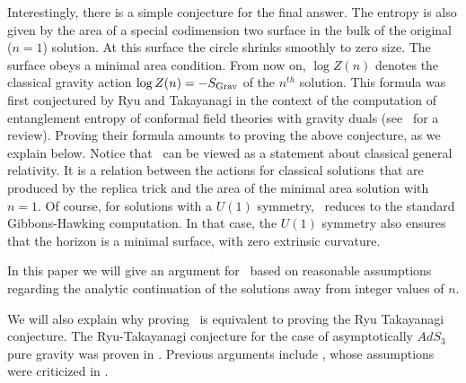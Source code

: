  Interestingly, there is a simple conjecture for the final answer.
 The entropy  is also given by the area of a special codimension two surface in the bulk of the
 original ($n=1$) solution.  At this surface
 the circle shrinks smoothly to zero size. The surface obeys a minimal area condition.
 \eqn{}
  From now on, $\log Z(n)$ denotes the classical gravity action $\log Z(n) = -S_{\rm Grav}$ of the $n^{th}$ solution.
  This formula was first conjectured by Ryu and Takayanagi in the context of the computation of entanglement entropy
 of conformal field theories with gravity duals \RyuBV (see \NishiokaUN\ for a review).
  Proving their formula amounts to proving the above conjecture,
 as we explain below.
 Notice that \RTconj\ can be viewed as
  a statement about classical general relativity. It is a relation between the actions for
  classical solutions  that are produced by the replica trick and the area of the minimal area
 solution with $n=1$. Of course, for solutions with a $U(1)$ symmetry, \RTconj\ reduces to the standard Gibbons-Hawking
 computation. In that case,  the $U(1)$ symmetry also ensures that the horizon is a minimal surface, with zero extrinsic
 curvature.

In this paper we will give an argument for \RTconj\  based on reasonable assumptions
regarding the analytic continuation of the solutions away from integer values of  $n$.

We will also explain why proving \RTconj\ is equivalent to proving the Ryu Takayanagi conjecture.
The Ryu-Takayanagi conjecture for the case of asymptotically $AdS_3$ pure gravity was proven in
. Previous arguments   include \FursaevIH , whose
assumptions were criticized in   \HeadrickZT .

